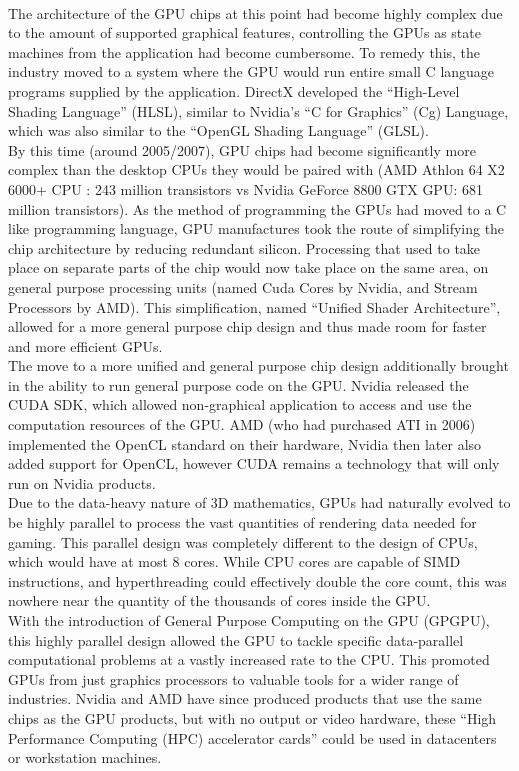\documentclass[12pt,a4paper]{article}
\begin{document}
\\
The architecture of the GPU chips at this point had become highly complex due to the amount of supported graphical features, controlling the GPUs as state machines from the application had become cumbersome. To remedy this, the industry moved to a system where the GPU would run entire small C language programs supplied by the application. DirectX developed the “High-Level Shading Language” (HLSL), similar to Nvidia’s “C for Graphics” (Cg) Language, which was also similar to the “OpenGL Shading Language” (GLSL).
\\
By this time (around 2005/2007), GPU chips had become significantly more complex than the desktop CPUs they would be paired with (AMD Athlon 64 X2 6000+ CPU : 243 million transistors vs Nvidia GeForce 8800 GTX GPU: 681 million transistors). As the method of programming the GPUs had moved to a C like programming language, GPU manufactures took the route of simplifying the chip architecture by reducing redundant silicon. Processing that used to take place on separate parts of the chip would now take place on the same area, on general purpose processing units (named Cuda Cores by Nvidia, and Stream Processors by AMD). This simplification, named “Unified Shader Architecture”, allowed for a more general purpose chip design and thus made room  for faster and more efficient GPUs. 
\\
The move to a more unified and general purpose chip design additionally brought in the ability to run general purpose code on the GPU. Nvidia released the CUDA SDK, which allowed non-graphical application to access and use the computation resources of the GPU. AMD (who had purchased ATI in 2006) implemented the OpenCL standard on their hardware, Nvidia then later also added support for OpenCL, however CUDA remains a technology that will only run on Nvidia products.
\\
Due to the data-heavy nature of 3D mathematics, GPUs had naturally evolved to be highly parallel to process the vast quantities of rendering data needed for gaming. This parallel design was completely different to the design of CPUs, which would have at most 8 cores. While CPU cores are capable of SIMD instructions, and hyperthreading could effectively double the core count, this was nowhere near the quantity of the thousands of cores inside the GPU. 
\\
With the introduction of General Purpose Computing on the GPU (GPGPU), this highly parallel design allowed the GPU to tackle specific data-parallel computational problems at a vastly increased rate to the CPU. This promoted GPUs from just graphics processors to valuable tools for a wider range of industries. Nvidia and AMD have since produced products that use the same chips as the GPU products, but with no output or video hardware, these “High Performance Computing (HPC) accelerator cards” could be used in datacenters or workstation machines.
\end{document}

